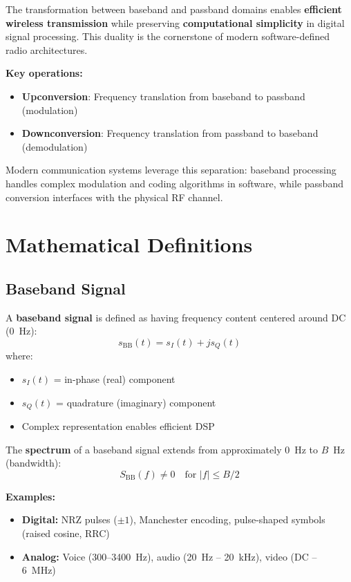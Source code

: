 \begin{keyconcept}
The transformation between baseband and passband domains enables \textbf{efficient wireless transmission} while preserving \textbf{computational simplicity} in digital signal processing. This duality is the cornerstone of modern software-defined radio architectures.
\end{keyconcept}

\textbf{Key operations:}
\begin{itemize}
\item \textbf{Upconversion}: Frequency translation from baseband to passband (modulation)
\item \textbf{Downconversion}: Frequency translation from passband to baseband (demodulation)
\end{itemize}

Modern communication systems leverage this separation: baseband processing handles complex modulation and coding algorithms in software, while passband conversion interfaces with the physical RF channel.

\section{Mathematical Definitions}

\subsection{Baseband Signal}

A \textbf{baseband signal} is defined as having frequency content centered around DC (0~Hz):
\begin{equation}
s_{\text{BB}}(t) = s_I(t) + js_Q(t)
\end{equation}
where:
\begin{itemize}
\item $s_I(t)$ = in-phase (real) component
\item $s_Q(t)$ = quadrature (imaginary) component
\item Complex representation enables efficient DSP
\end{itemize}

The \textbf{spectrum} of a baseband signal extends from approximately 0~Hz to $B$~Hz (bandwidth):
\begin{equation}
S_{\text{BB}}(f) \neq 0 \quad \text{for } |f| \leq B/2
\end{equation}

\textbf{Examples:}
\begin{itemize}
\item \textbf{Digital:} NRZ pulses ($\pm 1$), Manchester encoding, pulse-shaped symbols (raised cosine, RRC)
\item \textbf{Analog:} Voice (300--3400~Hz), audio (20~Hz -- 20~kHz), video (DC -- 6~MHz)
\end{itemize}

